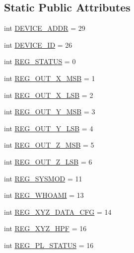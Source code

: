 \subsection*{Static Public Attributes}
\begin{DoxyCompactItemize}
\item 
int \hyperlink{classmma8451_1_1mma8451_aa9153d7880ea51bce9a1a5d98a7da4cb}{D\+E\+V\+I\+C\+E\+\_\+\+A\+D\+DR} = 29
\item 
int \hyperlink{classmma8451_1_1mma8451_aee12eb3fb8955987eaeff1988f71183e}{D\+E\+V\+I\+C\+E\+\_\+\+ID} = 26
\item 
int \hyperlink{classmma8451_1_1mma8451_aead05ff6f6b975e0123dd9e018088766}{R\+E\+G\+\_\+\+S\+T\+A\+T\+US} = 0
\item 
int \hyperlink{classmma8451_1_1mma8451_a37a55007ad41f147b3e2ca3f7ccf9d92}{R\+E\+G\+\_\+\+O\+U\+T\+\_\+\+X\+\_\+\+M\+SB} = 1
\item 
int \hyperlink{classmma8451_1_1mma8451_aa6a391d4b295954e7b9975db171ad61c}{R\+E\+G\+\_\+\+O\+U\+T\+\_\+\+X\+\_\+\+L\+SB} = 2
\item 
int \hyperlink{classmma8451_1_1mma8451_ac8e77bf0b3b32e35adf38fc6f6300563}{R\+E\+G\+\_\+\+O\+U\+T\+\_\+\+Y\+\_\+\+M\+SB} = 3
\item 
int \hyperlink{classmma8451_1_1mma8451_ae468342bc61776475df5b62aff2c14ff}{R\+E\+G\+\_\+\+O\+U\+T\+\_\+\+Y\+\_\+\+L\+SB} = 4
\item 
int \hyperlink{classmma8451_1_1mma8451_ad692850016d4970724a6022a12b575c9}{R\+E\+G\+\_\+\+O\+U\+T\+\_\+\+Z\+\_\+\+M\+SB} = 5
\item 
int \hyperlink{classmma8451_1_1mma8451_ae5d8b2d00255d21c27ef92edc7c83b0f}{R\+E\+G\+\_\+\+O\+U\+T\+\_\+\+Z\+\_\+\+L\+SB} = 6
\item 
int \hyperlink{classmma8451_1_1mma8451_ac3b80c73531b9062452af93e67a44d93}{R\+E\+G\+\_\+\+S\+Y\+S\+M\+OD} = 11
\item 
int \hyperlink{classmma8451_1_1mma8451_a20a4e0571a8f9180c557e58d597aa01a}{R\+E\+G\+\_\+\+W\+H\+O\+A\+MI} = 13
\item 
int \hyperlink{classmma8451_1_1mma8451_a894171a505e26b83c85d3e3b0aa71be3}{R\+E\+G\+\_\+\+X\+Y\+Z\+\_\+\+D\+A\+T\+A\+\_\+\+C\+FG} = 14
\item 
int \hyperlink{classmma8451_1_1mma8451_a2e6ef1815928746311767a4d730428e3}{R\+E\+G\+\_\+\+X\+Y\+Z\+\_\+\+H\+PF} = 16
\item 
int \hyperlink{classmma8451_1_1mma8451_a597f8e72f78a6e3661e1247aa30f4a80}{R\+E\+G\+\_\+\+P\+L\+\_\+\+S\+T\+A\+T\+US} = 16
\item 

\end{DoxyCompactItemize}
